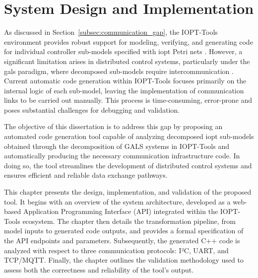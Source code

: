 
%

\chapter{System Design and Implementation}
\label{cha:chap_3}




As discussed in Section~\ref{subsec:communication_gap}, the IOPT-Tools environment provides robust support for modeling, verifying, and generating code for individual controller sub-models specified with \gls{iopt} Petri nets \cite{iopttools, barros2004, RefiningIOPT}. However, a significant limitation arises in distributed control systems, particularly under the \gls{gals} paradigm, where decomposed sub-models require intercommunication \cite{galsactd, Barrosadd}. Current automatic code generation within IOPT-Tools focuses primarily on the internal logic of each sub-model, leaving the implementation of communication links to be carried out manually. This process is time-consuming, error-prone and poses substantial challenges for debugging and validation.  

The objective of this dissertation is to address this gap by proposing an automated code generation tool capable of analyzing decomposed \gls{iopt} sub-models obtained through the decomposition of GALS systems in IOPT-Tools and automatically producing the necessary communication infrastructure code. In doing so, the tool streamlines the development of distributed control systems and ensures efficient and reliable data exchange pathways.  

This chapter presents the design, implementation, and validation of the proposed tool. It begins with an overview of the system architecture, developed as a web-based Application Programming Interface (API) integrated within the IOPT-Tools ecosystem. The chapter then details the transformation pipeline, from model inputs to generated code outputs, and provides a formal specification of the API endpoints and parameters. Subsequently, the generated C++ code is analyzed with respect to three communication protocols: I²C, UART, and TCP/MQTT. Finally, the chapter outlines the validation methodology used to assess both the correctness and reliability of the tool’s output.  



